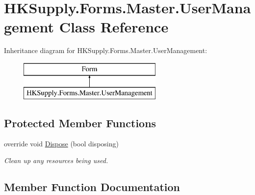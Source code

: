 \hypertarget{class_h_k_supply_1_1_forms_1_1_master_1_1_user_management}{}\section{H\+K\+Supply.\+Forms.\+Master.\+User\+Management Class Reference}
\label{class_h_k_supply_1_1_forms_1_1_master_1_1_user_management}
Inheritance diagram for H\+K\+Supply.\+Forms.\+Master.\+User\+Management\+:\begin{figure}[H]
\begin{center}
\leavevmode
\includegraphics[height=2.000000cm]{class_h_k_supply_1_1_forms_1_1_master_1_1_user_management}
\end{center}
\end{figure}
\subsection*{Protected Member Functions}
\begin{DoxyCompactItemize}
\item 
override void \hyperlink{class_h_k_supply_1_1_forms_1_1_master_1_1_user_management_a785e8f8b502b3ac465677f0817b29023}{Dispose} (bool disposing)
\begin{DoxyCompactList}\small\item\em Clean up any resources being used. \end{DoxyCompactList}\end{DoxyCompactItemize}


\subsection{Member Function Documentation}
\mbox{\label{class_h_k_supply_1_1_forms_1_1_master_1_1_user_management_a785e8f8b502b3ac465677f0817b29023}} 
